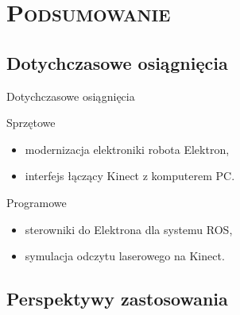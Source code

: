 \documentclass[xcolor=x11names,compress]{beamer}
\renewcommand{\(}{\begin{columns}}
\renewcommand{\)}{\end{columns}}
\newcommand{\<}[1]{\begin{column}{#1}}
\renewcommand{\>}{\end{column}}
\begin{document}
%
%
\section{\scshape Podsumowanie}

\subsection{Dotychczasowe osiągnięcia}

\begin{frame}{Dotychczasowe osiągnięcia}

    \alert{Sprzętowe}
    \begin{itemize}
    \item modernizacja elektroniki robota Elektron,
    \item interfejs łączący Kinect z komputerem PC.
    \end{itemize}

    \vspace{.4cm}
    \pause

    \alert{Programowe}
    \begin{itemize}
    \item sterowniki do Elektrona dla systemu ROS,
    \item symulacja odczytu laserowego na Kinect.
    \end{itemize}

\end{frame}

\subsection{Perspektywy zastosowania}
\end{document}
